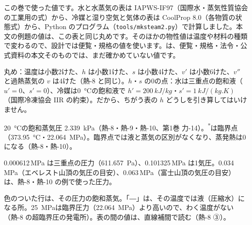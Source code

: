 {\small この巻で使った値です。水と水蒸気の表は IAPWS-IF97（国際水・蒸気性質協会の工業用の式）から、冷媒と湿り空気と気体の表は CoolProp 8.0（各物質の状態式）から、Python のプログラム（\texttt{tools/mksteam2.py}）で計算しました。本文の例題の値は、この表と同じ丸めです。そのほかの物性値は温度や材料の種類で変わるので、設計では便覧・規格の値を使います。\phyk は、便覧・規格・法令・公式資料の本文そのものでは、まだ確かめていない値です。\par}\vspace{1mm}
{\footnotesize\color{bkGray}丸め：温度は小数2けた、$h$ は小数1けた、$s$ は小数4けた、$v'$ は小数6けた、$v''$ と過熱蒸気の $v$ は4けた（熱-8 と同じ）。$h$・$s$ の0の点：水は三重点の飽和液（$u'=0$、$s'=0$）、冷媒は\qty{0}{\celsius}の飽和液で $h'=\qty{200}{kJ/kg}$・$s'=\qty{1}{kJ/(kg.K)}$（国際冷凍協会 IIR の約束）。だから、ちがう表の $h$ どうしを引き算してはいけません。\par}

{\footnotesize\color{bkGray}\qty{20}{\celsius}の飽和蒸気圧 \qty{2.339}{kPa}（熱-8・熱-9・熱-10、第1巻 力-14）。\textsuperscript{*}は臨界点（\qty{373.95}{\celsius}・\qty{22.064}{MPa}）。臨界点では液と蒸気の区別がなくなり、蒸発熱は0になる（熱-8・熱-10）。\par}\vspace{0.5mm}


{\footnotesize\color{bkGray}0.000612\,MPa は三重点の圧力（\qty{611.657}{Pa}）、0.101325\,MPa は1気圧。0.034\,MPa（エベレスト山頂の気圧の目安）、0.063\,MPa（富士山頂の気圧の目安）は、熱-8・熱-10 の例で使った圧力。\par}\vspace{0.5mm}


{\footnotesize\color{bkGray}色のついた行は、その圧力の飽和蒸気。「―」は、その温度では液（圧縮水）になる所。\qty{25}{MPa}は臨界圧力（\qty{22.064}{MPa}）より高いので、わく温度がない（熱-8 の超臨界圧の発電所）。表の間の値は、直線補間で読む（熱-8 ③）。\par}\vspace{1mm}


